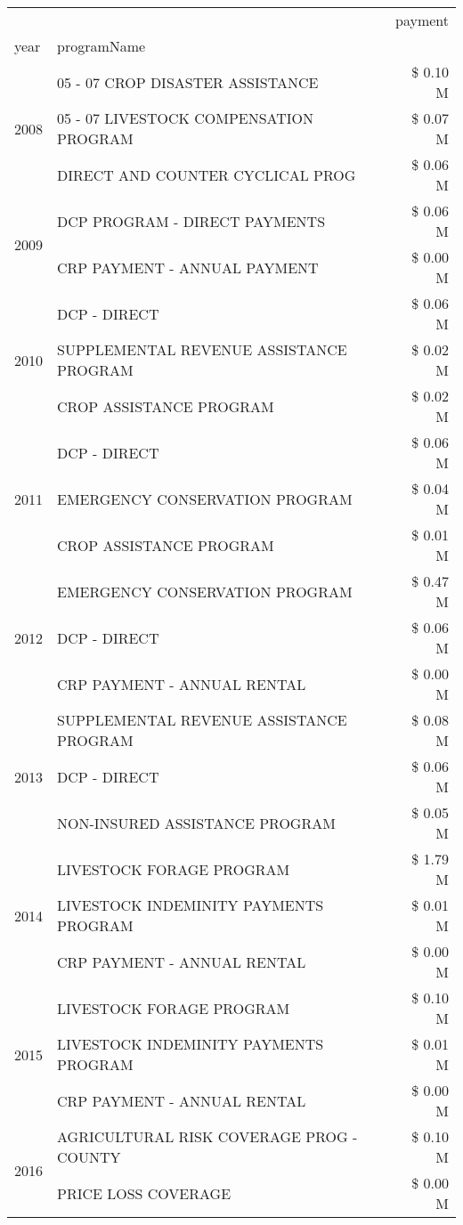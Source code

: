 \begin{tabular}{llr}
\toprule
 &  & payment \\
year & programName &  \\
\midrule
\multirow[t]{3}{*}{2008} & 05 - 07 CROP DISASTER ASSISTANCE & \$ 0.10 M \\
 & 05 - 07 LIVESTOCK COMPENSATION PROGRAM & \$ 0.07 M \\
 & DIRECT AND COUNTER CYCLICAL PROG & \$ 0.06 M \\
\cline{1-3}
\multirow[t]{2}{*}{2009} & DCP PROGRAM - DIRECT PAYMENTS & \$ 0.06 M \\
 & CRP PAYMENT - ANNUAL PAYMENT & \$ 0.00 M \\
\cline{1-3}
\multirow[t]{3}{*}{2010} & DCP - DIRECT & \$ 0.06 M \\
 & SUPPLEMENTAL REVENUE ASSISTANCE PROGRAM & \$ 0.02 M \\
 & CROP ASSISTANCE PROGRAM & \$ 0.02 M \\
\cline{1-3}
\multirow[t]{3}{*}{2011} & DCP - DIRECT & \$ 0.06 M \\
 & EMERGENCY CONSERVATION PROGRAM & \$ 0.04 M \\
 & CROP ASSISTANCE PROGRAM & \$ 0.01 M \\
\cline{1-3}
\multirow[t]{3}{*}{2012} & EMERGENCY CONSERVATION PROGRAM & \$ 0.47 M \\
 & DCP - DIRECT & \$ 0.06 M \\
 & CRP PAYMENT - ANNUAL RENTAL & \$ 0.00 M \\
\cline{1-3}
\multirow[t]{3}{*}{2013} & SUPPLEMENTAL REVENUE ASSISTANCE PROGRAM & \$ 0.08 M \\
 & DCP - DIRECT & \$ 0.06 M \\
 & NON-INSURED ASSISTANCE PROGRAM & \$ 0.05 M \\
\cline{1-3}
\multirow[t]{3}{*}{2014} & LIVESTOCK FORAGE PROGRAM & \$ 1.79 M \\
 & LIVESTOCK INDEMINITY PAYMENTS PROGRAM & \$ 0.01 M \\
 & CRP PAYMENT - ANNUAL RENTAL & \$ 0.00 M \\
\cline{1-3}
\multirow[t]{3}{*}{2015} & LIVESTOCK FORAGE PROGRAM & \$ 0.10 M \\
 & LIVESTOCK INDEMINITY PAYMENTS PROGRAM & \$ 0.01 M \\
 & CRP PAYMENT - ANNUAL RENTAL & \$ 0.00 M \\
\cline{1-3}
\multirow[t]{3}{*}{2016} & AGRICULTURAL RISK COVERAGE PROG - COUNTY & \$ 0.10 M \\
 & PRICE LOSS COVERAGE & \$ 0.00 M \\

\end{tabular}
